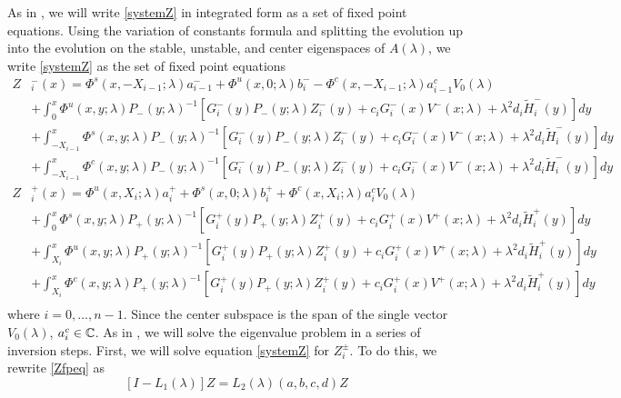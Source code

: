 \documentclass[thesis.tex]{subfiles}
\begin{document}
As in \cite{Sandstede1998}, we will write \eqref{systemZ} in integrated form as a set of fixed point equations. Using the variation of constants formula and splitting the evolution up into the evolution on the stable, unstable, and center eigenspaces of $A(\lambda)$, we write \eqref{systemZ} as the set of fixed point equations
\begin{equation}\label{Zfpeq}
\begin{aligned}
Z&_i^-(x) = \Phi^s(x, -X_{i-1}; \lambda) a_{i-1}^- + \Phi^u(x, 0; \lambda) b_i^- - \Phi^c(x, -X_{i-1}; \lambda) a_{i-1}^c V_0(\lambda) \\
&+ \int_0^x \Phi^u(x, y; \lambda)P_-(y; \lambda)^{-1} [ G_i^-(y) P_-(y; \lambda)Z_i^-(y) + c_i G_i^-(x) V^-(x; \lambda) + \lambda^2 d_i \tilde{H}_i^-(y)] dy \\
&+ \int_{-X_{i-1}}^x \Phi^s(x, y; \lambda) P_-(y; \lambda)^{-1}[ G_i^-(y) P_-(y; \lambda)Z_i^-(y) + c_i G_i^-(x) V^-(x; \lambda) + \lambda^2 d_i \tilde{H}_i^-(y)] dy \\
&+ \int_{-X_{i-1}}^x \Phi^c(x, y; \lambda) P_-(y; \lambda)^{-1}[ G_i^-(y) P_-(y; \lambda)Z_i^-(y) + c_i G_i^-(x) V^-(x; \lambda) + \lambda^2 d_i \tilde{H}_i^-(y)] dy  \\ 
Z&_i^+(x) = \Phi^u(x, X_i; \lambda) a_i^+ + \Phi^s(x, 0; \lambda) b_i^+ + \Phi^c(x, X_i; \lambda) a_i^c V_0(\lambda) \\
&+ \int_0^x \Phi^s(x, y; \lambda) P_+(y; \lambda)^{-1} [ G_i^+(y) P_+(y; \lambda) Z_i^+(y) + c_i G_i^+(x)V^+(x; \lambda) + \lambda^2 d_i \tilde{H}_i^+(y)] dy \\
&+ \int_{X_i}^x \Phi^u(x, y; \lambda) P_+(y; \lambda)^{-1} [ G_i^+(y) P_+(y; \lambda) Z_i^+(y) + c_i G_i^+(x)V^+(x; \lambda) + \lambda^2 d_i \tilde{H}_i^+(y)] dy \\
&+ \int_{X_i}^x \Phi^c(x, y; \lambda) P_+(y; \lambda)^{-1} [ G_i^+(y) P_+(y; \lambda) Z_i^+(y) + c_i G_i^+(x)V^+(x; \lambda) + \lambda^2 d_i \tilde{H}_i^+(y)] dy \\
\end{aligned}
\end{equation}
where $i = 0, \dots, n-1$. Since the center subspace is the span of the single vector $V_0(\lambda)$, $a_i^c \in \mathbb{C}$. As in \cite{Sandstede1998}, we will solve the eigenvalue problem in a series of inversion steps. First, we will solve equation \eqref{systemZ} for $Z_i^\pm$. To do this, we rewrite \eqref{Zfpeq} as
\begin{equation}\label{L1L2eq}
[I - L_1(\lambda)]Z = L_2(\lambda)(a,b,c,d)Z
\end{equation}
\end{document}
